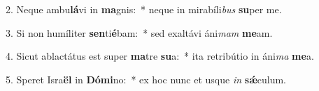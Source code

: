 2. Neque ambu\textbf{lá}vi in \textbf{ma}gnis:~*  neque in mirabíli\textit{bus} \textbf{su}per me.\

3. Si non humíliter \textbf{sen}ti\textbf{é}bam:~*  sed exaltávi áni\textit{mam} \textbf{me}am.\

4. Sicut ablactátus est super \textbf{ma}tre \textbf{su}a:~*  ita retribútio in áni\textit{ma} \textbf{me}a.\

5. Speret Isra\textbf{ël} in \textbf{Dó}\textbf{mi}no:~*  ex hoc nunc et usque \textit{in} \textbf{sǽ}culum.\

